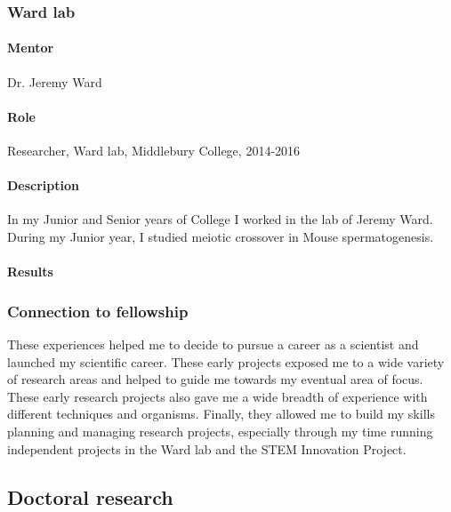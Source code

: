 \documentclass[11pt]{article}
\begin{document}
\subsubsection{Ward lab}
%
\paragraph{Mentor}
Dr. Jeremy Ward
%
\paragraph{Role}
Researcher, Ward lab, Middlebury College, 2014-2016
%
\paragraph{Description}
In my Junior and Senior years of College I worked in the lab of Jeremy Ward.
During my Junior year, I studied meiotic crossover in Mouse spermatogenesis.
%
\paragraph{Results}
%
\subsubsection{Connection to fellowship}
These experiences helped me to decide to pursue a career as a scientist and launched my scientific career. 
These early projects exposed me to a wide variety of research areas and helped to guide me towards my eventual area of focus.
These early research projects also gave me a wide breadth of experience with different techniques and organisms.
Finally, they allowed me to build my skills planning and managing research projects, especially through my time running independent projects in the Ward lab and the STEM Innovation Project.
%
\subsection{Doctoral research}
\end{document}

